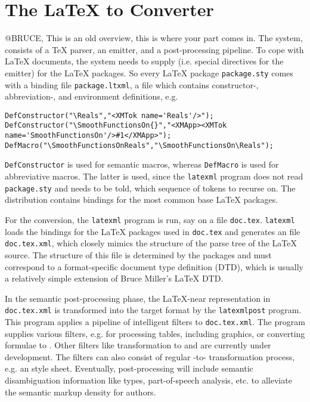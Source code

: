 \section{The {\latexml} {\LaTeX} to {\xml} Converter}\label{sec:latexml}

\begin{oldpart}{@BRUCE, This is an old overview, this is where your part comes in.}
The {\latexml} system, consists of a {\TeX} parser, an {\xml} emitter, and a
post-processing pipeline. To cope with {\LaTeX} documents, the system needs to
supply {} (i.e. special directives for the {\xml}
emitter) for the {\LaTeX} packages. So every {\LaTeX} package {\tt{package.sty}}
comes with a {\latexml} binding file {\tt{package.ltxml}}, a {\perl} file which
contains {\latexml} constructor-, abbreviation-, and environment definitions, e.g.

\begin{footnotesize}
\begin{verbatim}
DefConstructor("\Reals","<XMTok name='Reals'/>");
DefConstructor("\SmoothFunctionsOn{}","<XMApp><XMTok name='SmoothFunctionsOn'/>#1</XMApp>");
DefMacro("\SmoothFunctionsOnReals","\SmoothFunctionsOn\Reals");
\end{verbatim}
\end{footnotesize}  

{\tt{DefConstructor}} is used for semantic macros, whereas {\tt{DefMacro}} is used
for abbreviative macros. The latter is used, since the {\tt{latexml}} program does
not read {\tt{package.sty}} and needs to be told, which sequence of tokens to
recurse on. The {\latexml} distribution contains {\latexml} bindings for the most
common base {\LaTeX} packages.

For the {\xml} conversion, the {\tt{latexml}} program is run, say on a file
{\tt{doc.tex}}. {\tt{latexml}} loads the {\latexml} bindings for the {\LaTeX}
packages used in {\tt{doc.tex}} and generates an {\xml} file {\tt{doc.tex.xml}},
which closely mimics the structure of the parse tree of the {\LaTeX} source. The
structure of this file is determined by the {\latexml} packages and must
correspond to a format-specific document type definition (DTD), which is usually a
relatively simple extension of Bruce Miller's {\LaTeX} DTD.

In the semantic post-processing phase, the {\LaTeX}-near representation in
{\tt{doc.tex.xml}} is transformed into the target format by the {\tt{latexmlpost}}
program. This program applies a pipeline of intelligent filters to
{\tt{doc.tex.xml}}. The {\latexml} program supplies various filters, e.g. for
processing {\html} tables, including graphics, or converting formulae to
{\pmathml}. Other filters like transformation to {\openmath} and {\cmathml} are
currently under development. The filters can also consist of regular
{\xml}-to-{\xml} transformation process, e.g.  an {\xslt} style sheet. Eventually,
post-processing will include semantic disambiguation information like types,
part-of-speech analysis, etc. to alleviate the semantic markup density for
authors.
\end{oldpart}

